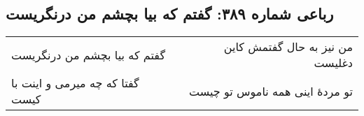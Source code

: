 \begin{center}
\section*{رباعی شماره ۳۸۹: گفتم که بیا بچشم من درنگریست}
\label{sec:0389}
\begin{longtable}{l p{0.5cm} r}
گفتم که بیا بچشم من درنگریست
&&
من نیز به حال گفتمش کاین دغلیست
\\
گفتا که چه میرمی و اینت با کیست
&&
تو مردهٔ اینی همه ناموس تو چیست
\\
\end{longtable}
\end{center}
